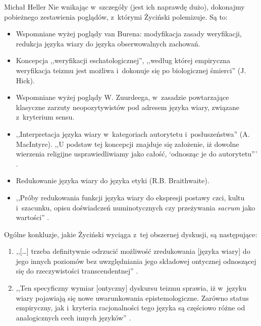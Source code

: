 \begin{artplenv}{Michał Heller}
Nie wnikając w~szczegóły (jest ich naprawdę dużo), dokonajmy pobieżnego zestawienia poglądów, z~którymi Życiński polemizuje. Są to:

\begin{itemize}
\item Wspomniane wyżej poglądy van Burena: modyfikacja zasady weryfikacji, redukcja języka wiary do języka obserwowalnych zachowań.
\item Koncepcja ,,weryfikacji eschatologicznej'', ,,według której empiryczna weryfikacja teizmu jest możliwa i~dokonuje się po biologicznej śmierci''
\parencite[][s.~27]{zycinski_teizm_1985} %
 (J. Hick).
\item Wspomniane wyżej poglądy W. Zuurdeega, w~zasadzie powtarzające klasyczne zarzuty neopozytywistów pod adresem języka wiary, związane z~kryterium sensu.
\item ,,Interpretacja języka wiary w~kategoriach autorytetu i~posłuszeństwa'' (A. MacIntyre). ,,U podstaw tej koncepcji znajduje się założenie, iż dowolne wierzenia religijne usprawiedliwiamy jako całość, ‘odnosząc je do autorytetu'''
\parencite[][s.~29]{zycinski_teizm_1985}.%

\item Redukowanie języka wiary do języka etyki (R.B. Braithwaite).
\item ,,Próby redukowania funkcji języka wiary do ekspresji postawy czci, kultu i~szacunku, opisu doświadczeń numinotycznych czy przeżywania \textit{sacrum} jako wartości''
\parencite[][s.~31]{zycinski_teizm_1985}.%

\end{itemize}
Ogólne konkluzje, jakie Życiński wyciąga z~tej obszernej dyskusji, są następujące:

\begin{enumerate}
\item ,,[\ldots] trzeba definitywnie odrzucić możliwość zredukowania [języka wiary] do jego innych poziomów bez uwzględniania jego składowej ontycznej odnoszącej się do rzeczywistości transcendentnej''
\parencite[][s.~32]{zycinski_teizm_1985}.%

\item ,,Ten specyficzny wymiar [ontyczny] dyskursu teizmu sprawia, iż w~języku wiary pojawiają się nowe uwarunkowania epistemologiczne. Zarówno status empiryczny, jak i~kryteria racjonalności tego języka są częściowo różne od analogicznych cech innych języków''
\parencite[][s.~32]{zycinski_teizm_1985}.%


\end{enumerate}
\end{artplenv}
